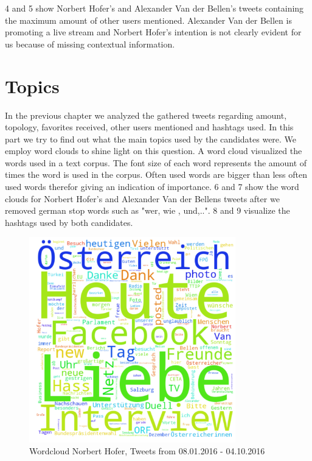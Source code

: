 \documentclass{llncs}
\begin{document}
\figurename{4} and \figurename{5} show Norbert Hofer's and Alexander Van der Bellen's tweets containing the maximum amount of other users mentioned. Alexander Van der Bellen is promoting a live stream and Norbert Hofer's intention is not clearly evident for us because of missing contextual information.


\section{Topics}
In the previous chapter we analyzed the gathered tweets regarding amount, topology, favorites received, other users mentioned and hashtags used. In this part we try to find out what the main topics used by the candidates were. We employ word clouds to shine light on this question. A word cloud visualized the words used in a text corpus. The font size of each word represents the amount of times the word is used in the corpus. Often used words are bigger than less often used words therefor giving an indication of importance. \figurename{6} and \figurename{7} show the word clouds for Norbert Hofer's and Alexander Van der Bellens tweets after we removed german stop words such as "wer, wie , und,..". \figurename{8} and \figurename{9} visualize the hashtags used by both candidates.
\begin{figure}[htbp] 
	\centering
	\includegraphics[width=0.8\textwidth]{grafics/wordcloud_hofer.png}
	\caption{Wordcloud Norbert Hofer, Tweets from 08.01.2016 - 04.10.2016}
	\label{fig:Wordcloud Norbert Hofer}
\end{figure}
\end{document}
